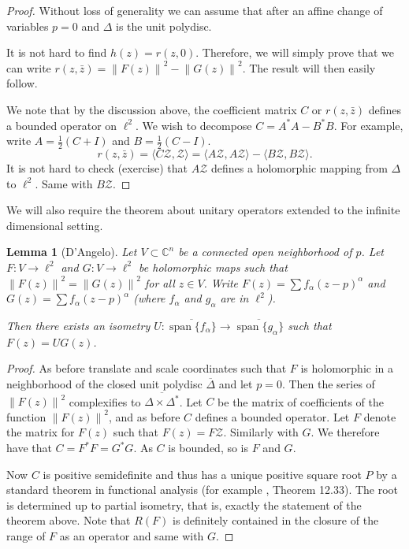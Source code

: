 \documentclass[12pt,openany]{book}
\newcommand{\norm}[1]{\left\lVert {#1} \right\rVert}
\newcommand{\C}{{\mathbb{C}}}
\newcommand{\sZ}{{\mathcal{Z}}}
\theoremstyle{plain}
\newtheorem{lemma}[thm]{Lemma}
\theoremstyle{remark}
\theoremstyle{definition}
\theoremstyle{exercise}
\theoremstyle{example}
\begin{document}
\begin{proof}
Without loss of generality we can assume that after an affine
change of variables $p =0$ and $\Delta$ is the unit polydisc.

It is not hard to find $h(z) = r(z,0)$.  Therefore, we will simply prove
that we can write 
$r(z,\bar{z}) = \norm{F(z)}^2 - \norm{G(z)}^2$.  The result will then easily
follow.

We note that by the discussion above, the coefficient matrix $C$ or
$r(z,\bar{z})$ defines
a bounded operator on $\ell^2$.  We wish to decompose $C = A^*A - B^*B$.  For example,
write $A = \frac{1}{2} (C+I)$ and $B = \frac{1}{2} (C-I)$.
\begin{equation}
r(z,\bar{z}) = \langle C \sZ , \sZ \rangle
=
\langle A \sZ , A \sZ \rangle
-
\langle B \sZ , B \sZ \rangle .
\end{equation}
It is not hard to check (exercise) that $A \sZ$ defines a holomorphic mapping from
$\Delta$ to $\ell^2$.  Same with $B \sZ$.
\end{proof}

We will also require the theorem about unitary operators extended to the
infinite dimensional setting.

\begin{lemma}[D'Angelo] \label{lemma:extU}
Let $V \subset \C^n$ be a connected open neighborhood of $p$.
Let $F \colon V \to \ell^2$ and 
$G \colon V \to \ell^2$ be holomorphic maps such that
$\norm{F(z)}^2 = \norm{G(z)}^2$ for all $z \in V$. 
Write $F(z) = \sum f_\alpha (z-p)^\alpha$ and 
$G(z) = \sum f_\alpha (z-p)^\alpha$ (where $f_\alpha$ and $g_\alpha$ are in
$\ell^2$).

Then 
there exists an isometry $U \colon
\overline{\operatorname{span}\{f_\alpha\}}
\to
\overline{\operatorname{span}\{g_\alpha\}}$
such that
$F(z) = U G(z)$.
\end{lemma}

\begin{proof}
As before translate and scale coordinates
such that $F$ is holomorphic in a neighborhood of
the closed unit polydisc $\overline{\Delta}$ and let $p=0$.
Then the series of $\norm{F(z)}^2$ complexifies to
$\overline{\Delta \times \Delta^*}$.
Let $C$ be the matrix
of coefficients of the function $\norm{F(z)}^2$, and as before $C$
defines a bounded operator.
  Let $F$ denote the
matrix for $F(z)$ such that $F(z) = F \sZ$.  Similarly with $G$.  We
therefore have that $C = F^*F = G^*G$.  As $C$ is bounded, so is $F$ and $G$.

Now $C$ is positive semidefinite and thus has a unique positive square root
$P$ by a standard theorem in functional analysis (for example
\cite{Rudin:fanal}, Theorem 12.33).  The root is determined up to partial isometry, that is,
exactly the statement of the theorem above.  Note that $R(F)$ is definitely
contained in the closure of the range of $F$ as an operator and same with
$G$.
\end{proof}
\end{document}
